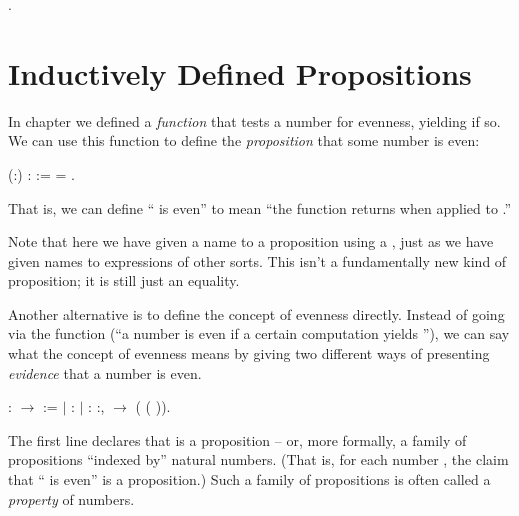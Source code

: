 \documentclass[12pt]{report}
\begin{document}
\begin{coqdoccode}
\coqdocemptyline
\coqdocnoindent
{}  .\coqdoceol
\coqdocemptyline
\end{coqdoccode}
\section{Inductively Defined Propositions}



 In chapter  we defined a \textit{function}  that tests a
    number for evenness, yielding  if so.  We can use this
    function to define the \textit{proposition} that some number  is
    even: \begin{coqdoccode}
\coqdocemptyline
\coqdocnoindent
{}  (:) :  := \coqdoceol
\coqdocindent{1.00em}
  = .\coqdoceol
\coqdocemptyline
\end{coqdoccode}
That is, we can define `` is even'' to mean ``the function 
    returns  when applied to .''  


    Note that here we have given a name
    to a proposition using a , just as we have
    given names to expressions of other sorts. This isn't a fundamentally
    new kind of proposition;  it is still just an equality. 

 Another alternative is to define the concept of evenness
    directly.  Instead of going via the  function (``a number is
    even if a certain computation yields ''), we can say what the
    concept of evenness means by giving two different ways of
    presenting \textit{evidence} that a number is even. \begin{coqdoccode}
\coqdocemptyline
\coqdocnoindent
{}  :  \ensuremath{\rightarrow}  :=\coqdoceol
\coqdocindent{1.00em}
\ensuremath{|}  :  \coqdoceol
\coqdocindent{1.00em}
\ensuremath{|}  : \coqdockw{\ensuremath{\forall}} :,   \ensuremath{\rightarrow}  ( ( )).\coqdoceol
\coqdocemptyline
\end{coqdoccode}
The first line declares that  is a proposition -- or,
    more formally, a family of propositions ``indexed by'' natural
    numbers.  (That is, for each number , the claim that `` is
    even'' is a proposition.)  Such a family of propositions is
    often called a \textit{property} of numbers.  
\end{document}
